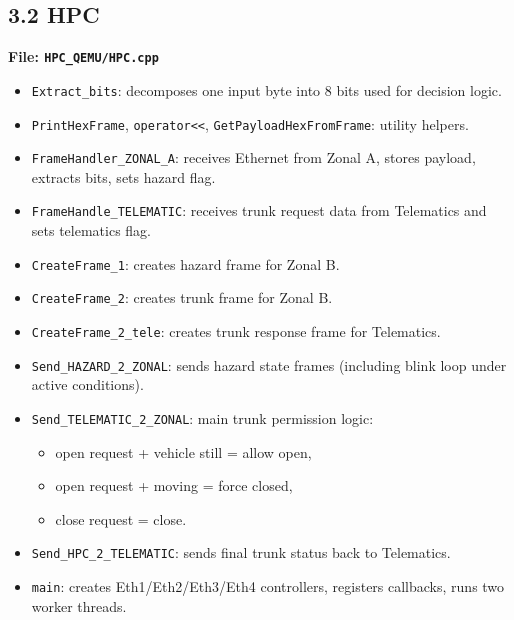 \documentclass[11pt,a4paper]{article}
\begin{document}
\subsection*{3.2 HPC}
\textbf{File: \texttt{HPC\_QEMU/HPC.cpp}}
\begin{itemize}
  \item \texttt{Extract\_bits}: decomposes one input byte into 8 bits used for decision logic.
  \item \texttt{PrintHexFrame}, \texttt{operator<<}, \texttt{GetPayloadHexFromFrame}: utility helpers.
  \item \texttt{FrameHandler\_ZONAL\_A}: receives Ethernet from Zonal A, stores payload, extracts bits, sets hazard flag.
  \item \texttt{FrameHandle\_TELEMATIC}: receives trunk request data from Telematics and sets telematics flag.
  \item \texttt{CreateFrame\_1}: creates hazard frame for Zonal B.
  \item \texttt{CreateFrame\_2}: creates trunk frame for Zonal B.
  \item \texttt{CreateFrame\_2\_tele}: creates trunk response frame for Telematics.
  \item \texttt{Send\_HAZARD\_2\_ZONAL}: sends hazard state frames (including blink loop under active conditions).
  \item \texttt{Send\_TELEMATIC\_2\_ZONAL}: main trunk permission logic:
  \begin{itemize}
    \item open request + vehicle still = allow open,
    \item open request + moving = force closed,
    \item close request = close.
  \end{itemize}
  \item \texttt{Send\_HPC\_2\_TELEMATIC}: sends final trunk status back to Telematics.
  \item \texttt{main}: creates Eth1/Eth2/Eth3/Eth4 controllers, registers callbacks, runs two worker threads.
\end{itemize}
\end{document}
